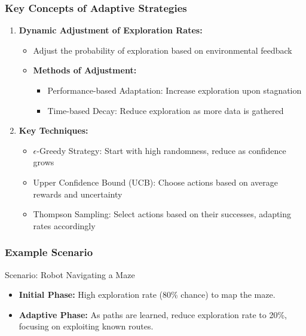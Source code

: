 \documentclass[aspectratio=169]{beamer}
\begin{document}
\begin{frame}[fragile]
    \frametitle{Key Concepts of Adaptive Strategies}
    \begin{enumerate}
        \item \textbf{Dynamic Adjustment of Exploration Rates:}
        \begin{itemize}
            \item Adjust the probability of exploration based on environmental feedback
            \item \textbf{Methods of Adjustment:}
            \begin{itemize}
                \item Performance-based Adaptation: Increase exploration upon stagnation
                \item Time-based Decay: Reduce exploration as more data is gathered
            \end{itemize}
        \end{itemize}
        
        \item \textbf{Key Techniques:}
        \begin{itemize}
            \item $\epsilon$-Greedy Strategy: Start with high randomness, reduce as confidence grows
            \item Upper Confidence Bound (UCB): Choose actions based on average rewards and uncertainty
            \item Thompson Sampling: Select actions based on their successes, adapting rates accordingly
        \end{itemize}
    \end{enumerate}
\end{frame}

\begin{frame}[fragile]
    \frametitle{Example Scenario}
    \begin{block}{Scenario: Robot Navigating a Maze}
        \begin{itemize}
            \item \textbf{Initial Phase:} High exploration rate (80\% chance) to map the maze.
            \item \textbf{Adaptive Phase:} As paths are learned, reduce exploration rate to 20\%, focusing on exploiting known routes.
        \end{itemize}
    \end{block}
\end{frame}
\end{document}
